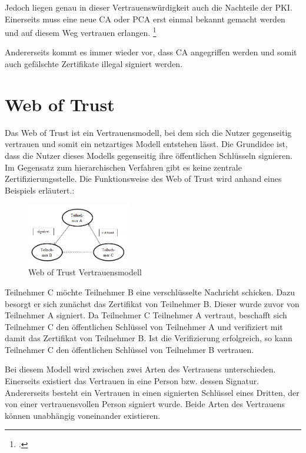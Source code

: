 \documentclass  [paper=a4,
				fontsize=12pt,
				listof=totoc,
				bibliography=totoc
				]{scrreprt}
\begin{document}
			Jedoch liegen genau in dieser Vertrauenswürdigkeit auch die Nachteile der \ac{PKI}. Einerseits muss eine neue \ac{CA} oder \ac{PCA} erst einmal bekannt gemacht werden und auf diesem Weg vertrauen erlangen. \footcite[Vgl.][]{Schwenk, S.24}
			
			Andererseits kommt es immer wieder vor, dass \ac{CA} angegriffen werden und somit auch gefälschte Zertifikate illegal signiert werden.
				
		\section{Web of Trust}
			Das Web of Trust ist ein Vertrauensmodell, bei dem sich die Nutzer gegenseitig vertrauen und somit ein netzartiges Modell entstehen lässt. Die Grundidee ist, dass die Nutzer dieses Modells gegenseitig ihre öffentlichen Schlüsseln signieren. Im Gegensatz zum hierarchischen Verfahren gibt es keine zentrale Zertifizierungsstelle.
			Die Funktionsweise des Web of Trust wird anhand eines Beispiels erläutert.:
			\begin{figure}
			\centering
				\includegraphics[width=0.4\textwidth]{images/WOT.png}
			\caption[Web of Trust Vertrauensmodell]{Web of Trust Vertrauensmodell\footnotemark}
			\end{figure}
			Teilnehmer C möchte Teilnehmer B eine verschlüsselte Nachricht schicken. Dazu besorgt er sich zunächst das Zertifikat von Teilnehmer B. Dieser wurde zuvor von Teilnehmer A signiert. Da Teilnehmer C Teilnehmer A vertraut, beschafft sich Teilnehmer C den öffentlichen Schlüssel von Teilnehmer A und verifiziert mit damit das Zertifikat von Teilnehmer B. Ist die Verifizierung erfolgreich, so kann Teilnehmer C den öffentlichen Schlüssel von Teilnehmer B vertrauen.
			
			Bei diesem Modell wird zwischen zwei Arten des Vertrauens unterschieden. Einerseits existiert das Vertrauen in eine Person bzw. dessen Signatur. Andererseits besteht ein Vertrauen in einen signierten Schlüssel eines Dritten, der von einer vertrauensvollen Person signiert wurde. Beide Arten des Vertrauens können unabhängig voneinander existieren.
\end{document}
